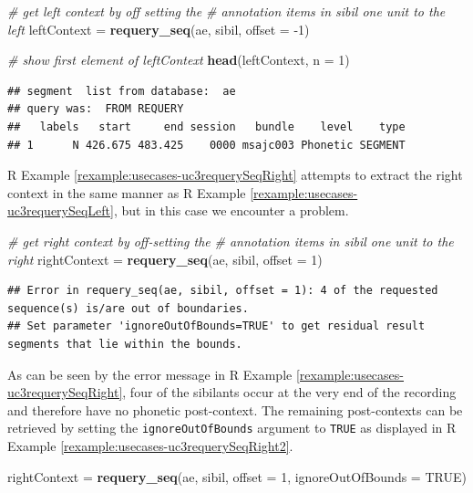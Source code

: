 \documentclass[]{book}
\newenvironment{Shaded}{\begin{snugshade}}{\end{snugshade}}
\newcommand{\CommentTok}[1]{\textcolor[rgb]{0.56,0.35,0.01}{\textit{#1}}}
\newcommand{\DataTypeTok}[1]{\textcolor[rgb]{0.13,0.29,0.53}{#1}}
\newcommand{\DecValTok}[1]{\textcolor[rgb]{0.00,0.00,0.81}{#1}}
\newcommand{\KeywordTok}[1]{\textcolor[rgb]{0.13,0.29,0.53}{\textbf{#1}}}
\newcommand{\NormalTok}[1]{#1}
\newcommand{\OtherTok}[1]{\textcolor[rgb]{0.56,0.35,0.01}{#1}}
\newcommand{\StringTok}[1]{\textcolor[rgb]{0.31,0.60,0.02}{#1}}
\theoremstyle{definition}
\theoremstyle{definition}
\theoremstyle{definition}
\theoremstyle{remark}
\begin{document}
\begin{Shaded}
\begin{Highlighting}[]
\CommentTok{# get left context by off setting the }
\CommentTok{# annotation items in sibil one unit to the left}
\NormalTok{leftContext =}\StringTok{ }\KeywordTok{requery_seq}\NormalTok{(ae, sibil, }\DataTypeTok{offset =} \DecValTok{-1}\NormalTok{)}

\CommentTok{# show first element of leftContext}
\KeywordTok{head}\NormalTok{(leftContext, }\DataTypeTok{n =} \DecValTok{1}\NormalTok{)}
\end{Highlighting}
\end{Shaded}

\begin{verbatim}
## segment  list from database:  ae 
## query was:  FROM REQUERY 
##   labels   start     end session   bundle    level    type
## 1      N 426.675 483.425    0000 msajc003 Phonetic SEGMENT
\end{verbatim}

R Example \ref{rexample:usecases-uc3requerySeqRight} attempts to extract
the right context in the same manner as R Example
\ref{rexample:usecases-uc3requerySeqLeft}, but in this case we encounter
a problem.

\begin{Shaded}
\begin{Highlighting}[]
\CommentTok{# get right context by off-setting the }
\CommentTok{# annotation items in sibil one unit to the right}
\NormalTok{rightContext =}\StringTok{ }\KeywordTok{requery_seq}\NormalTok{(ae, sibil, }\DataTypeTok{offset =} \DecValTok{1}\NormalTok{)}
\end{Highlighting}
\end{Shaded}

\begin{verbatim}
## Error in requery_seq(ae, sibil, offset = 1): 4 of the requested sequence(s) is/are out of boundaries.
## Set parameter 'ignoreOutOfBounds=TRUE' to get residual result segments that lie within the bounds.
\end{verbatim}

As can be seen by the error message in R Example
\ref{rexample:usecases-uc3requerySeqRight}, four of the sibilants occur
at the very end of the recording and therefore have no phonetic
post-context. The remaining post-contexts can be retrieved by setting
the \texttt{ignoreOutOfBounds} argument to \texttt{TRUE} as displayed in
R Example \ref{rexample:usecases-uc3requerySeqRight2}.

\begin{Shaded}
\begin{Highlighting}[]
\NormalTok{rightContext =}\StringTok{ }\KeywordTok{requery_seq}\NormalTok{(ae, sibil,}
                           \DataTypeTok{offset =} \DecValTok{1}\NormalTok{,}
                           \DataTypeTok{ignoreOutOfBounds =} \OtherTok{TRUE}\NormalTok{)}
\end{Highlighting}
\end{Shaded}
\end{document}
